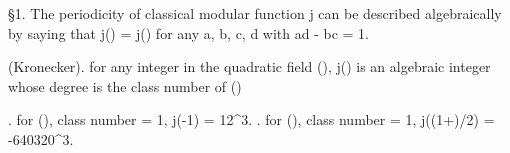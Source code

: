 
  \S 1. The periodicity of classical modular function j can be 
described algebraically by saying that j(\tau) = j() 
for any a, b, c, d \in \Z with ad - bc = 1.

\theorem (Kronecker). for any integer \tau in the quadratic field \Q(), 
j(\tau) is an algebraic integer whose degree is the class number of \Q()

\example. for \Q(), class number = 1, j(-1) = 12^3.
\example. for \Q(), class number = 1, j((1+)/2) = -640320^3.

